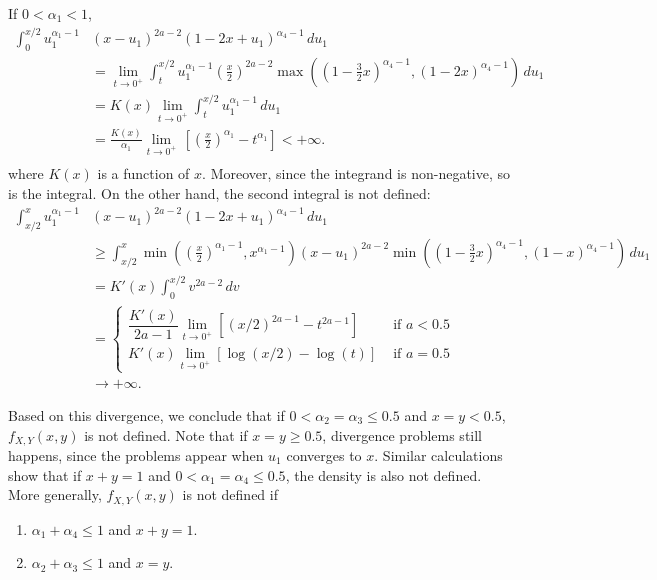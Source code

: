 If $0 < \alpha_1 < 1$, 
\begin{equation*}
  \begin{split}
    \int_{0}^{x/2} u_1^{\alpha_1-1}&(x-u_1)^{2a-2}(1-2x+u_1)^{\alpha_4-1} \, du_1 \\
    &= \lim_{t\to 0^+}\int_{t}^{x/2} u_1^{\alpha_1-1}\left(\frac{x}{2}\right)^{2a-2}\max\left(\left(1-\frac{3}{2}x\right)^{\alpha_4-1}, (1-2x)^{\alpha_4-1}\right) \, du_1 \\ 
    &= K(x)\lim_{t\to 0^+}\int_{t}^{x/2} u_1^{\alpha_1-1}\, du_1 \\ 
    &= \frac{K(x)}{\alpha_1}\lim_{t\to 0^+} \, \left[\left(\frac{x}{2}\right)^{\alpha_1} - t^{\alpha_1}\right] < +\infty .\\ 
  \end{split}
\end{equation*}
where $K(x)$ is a function of $x$. Moreover, since the integrand is non-negative, so is the integral. On the
other hand, the second integral is not defined: 
\begin{equation*}
  \begin{split}
    \int_{x/2}^{x} u_1^{\alpha_1-1}&(x-u_1)^{2a-2}(1-2x+u_1)^{\alpha_4-1} \, du_1 \\
    &\ge \int_{x/2}^x \min\left(\left(\frac{x}{2}\right)^{\alpha_1-1}, x^{\alpha_1-1}\right)(x-u_1)^{2a-2}\min\left(\left(1-\frac{3}{2}x\right)^{\alpha_4-1}, (1-x)^{\alpha_4-1}\right) \, du_1 \\
    &= K'(x) \int_{0}^{x/2} v^{2a-2} \, dv \\ 
    &= \begin{cases}
      \dfrac{K'(x)}{2a-1} \lim_{t \to 0^+} \left[(x/2)^{2a-1} - t^{2a-1}\right] &\text{ if } a < 0.5 \\ 
      K'(x) \lim_{t \to 0^+} \left[\log(x/2) - \log(t)\right] &\text{ if } a = 0.5
    \end{cases} \\
    &\to +\infty.
  \end{split}
\end{equation*}

Based on this divergence, we conclude that if $0 < \alpha_2 = \alpha_3 \le 0.5$
and $x = y < 0.5$, $f_{X,Y}(x,y)$ is not defined. Note that if $x = y \ge
0.5$, divergence problems still happens, since the problems appear when $u_1$
converges to $x$. Similar calculations show
that if $x + y = 1$ and $0 < \alpha_1 = \alpha_4 \le 0.5$, the density is also
not defined. More generally, $f_{X,Y}(x,y)$ is not defined if 

\begin{enumerate}
  \item $\alpha_1 + \alpha_4 \le 1$ and $x + y = 1$. 
  \item $\alpha_2 + \alpha_3 \le 1$ and $x = y$. 
\end{enumerate}

